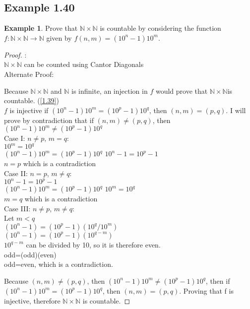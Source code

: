\documentclass[openany, amssymb, psamsfonts]{amsart}
\newcommand{\bbN}{\mathbb{N}}
\theoremstyle{definition}
\newtheorem{exmp}{Example}[section]
\numberwithin{equation}{section}
\begin{document}
\subsection{Example 1.40}
\begin{exmp}
    Prove that $\bbN\times \bbN$ is countable by considering the function $f:\bbN\times\bbN\longrightarrow \bbN$ given by $f(n,m)=(10^n-1)10^m$.
\end{exmp}
\begin{proof}:\\
$\bbN\times \bbN$ can be counted using Cantor Diagonals\\
Alternate Proof:

Because $\bbN\times \bbN$ and $\bbN$ is infinite, an injection in $f$ would prove that $\bbN\times \bbN$is countable. (\ref{1.39})\\
$f$ is injective if $(10^n-1)10^m=(10^p-1)10^q$, then $(n,m)=(p,q)$. I will prove by contradiction that if $(n,m)\neq(p,q)$, then $(10^n-1)10^m\neq(10^p-1)10^q$\\

Case I: $n\neq p$, $m=q$:\\
$10^m=10^q$\\
$(10^n-1)10^m=(10^p-1)10^q$
$10^n-1=10^p-1$\\
$n=p$ which is a contradiction\\

Case II: $n=p$, $m\neq q$:\\
$10^n-1=10^p-1$\\
$(10^n-1)10^m=(10^p-1)10^q$
$10^m=10^q$\\
$m=q$ which is a contradiction\\

Case III: $n\neq p$, $m\neq q$:\\
Let $m<q$\\
$(10^n-1)=(10^p-1)(10^q/10^m)$\\
$(10^n-1)=(10^p-1)(10^{q-m})$\\
$10^{q-m}$ can be divided by 10, so it is therefore even.\\
odd=(odd)(even)\\
odd=even, which is a contradiction.

Because $(n,m)\neq(p,q)$, then $(10^n-1)10^m\neq(10^p-1)10^q$, then if $(10^n-1)10^m=(10^p-1)10^q$, then $(n,m)=(p,q)$. Proving that f is injective, therefore $\bbN\times \bbN$ is countable. 
\end{proof}
\end{document}
